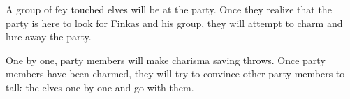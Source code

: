 A group of fey touched elves will be at the party.
Once they realize that the party is here to look for Finkas and his group, they will attempt to charm and lure away the party.

One by one, party members will make charisma saving throws.
Once party members have been charmed, they will try to convince other party members to talk the elves one by one and go with them.
